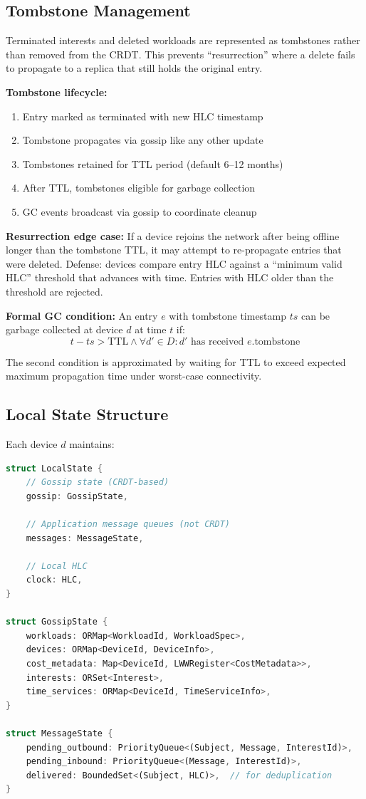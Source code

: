 \subsection{Tombstone Management}

Terminated interests and deleted workloads are represented as tombstones rather than removed from the CRDT. This prevents ``resurrection'' where a delete fails to propagate to a replica that still holds the original entry.

\textbf{Tombstone lifecycle:}
\begin{enumerate}
    \item Entry marked as terminated with new HLC timestamp
    \item Tombstone propagates via gossip like any other update
    \item Tombstones retained for TTL period (default 6--12 months)
    \item After TTL, tombstones eligible for garbage collection
    \item GC events broadcast via gossip to coordinate cleanup
\end{enumerate}

\textbf{Resurrection edge case:} If a device rejoins the network after being offline longer than the tombstone TTL, it may attempt to re-propagate entries that were deleted. Defense: devices compare entry HLC against a ``minimum valid HLC'' threshold that advances with time. Entries with HLC older than the threshold are rejected.

\textbf{Formal GC condition:} An entry $e$ with tombstone timestamp $ts$ can be garbage collected at device $d$ at time $t$ if:
\[
t - ts > \text{TTL} \land \forall d' \in D : d' \text{ has received } e.\text{tombstone}
\]

The second condition is approximated by waiting for TTL to exceed expected maximum propagation time under worst-case connectivity.

\subsection{Local State Structure}

Each device $d$ maintains:

\begin{lstlisting}[language=Rust]
struct LocalState {
    // Gossip state (CRDT-based)
    gossip: GossipState,
    
    // Application message queues (not CRDT)
    messages: MessageState,
    
    // Local HLC
    clock: HLC,
}

struct GossipState {
    workloads: ORMap<WorkloadId, WorkloadSpec>,
    devices: ORMap<DeviceId, DeviceInfo>,
    cost_metadata: Map<DeviceId, LWWRegister<CostMetadata>>,
    interests: ORSet<Interest>,
    time_services: ORMap<DeviceId, TimeServiceInfo>,
}

struct MessageState {
    pending_outbound: PriorityQueue<(Subject, Message, InterestId)>,
    pending_inbound: PriorityQueue<(Message, InterestId)>,
    delivered: BoundedSet<(Subject, HLC)>,  // for deduplication
}
\end{lstlisting}

